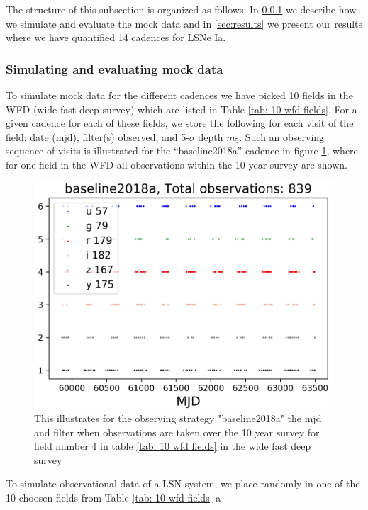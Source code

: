 The structure of this subsection is organized as follows. In
\ref{sec:simulation of mock data} we describe how we simulate and
evaluate the mock data and in \ref{sec:results} we present our results
where we have quantified 14 cadences for LSNe Ia.

\subsubsection{Simulating and evaluating mock data}
\label{sec:simulation of mock data}
To simulate mock data for the different cadences we have picked 10
fields in the WFD (wide fast deep survey) which are listed in Table
\ref{tab: 10 wfd fields}. For a given cadence for each of these
fields, we store the following for each visit of the field: date
(mjd), filter(s) observed, and 5-$\sigma$ depth $m_5$. Such an
observing sequence of visits is illustrated for the ``baseline2018a''
cadence in figure \ref{fig:observation patter LSST 10 year survey},
where for one field in the WFD all observations within the 10 year
survey are shown. 
%
\begin{figure}
\centering
\includegraphics[scale=0.7]{figures/field_number3_baseline2018a_Daniel.jpg}
\caption{This illustrates for the observing strategy "baseline2018a" the mjd and filter when observations are taken over the 10 year survey for field number 4 in table \ref{tab: 10 wfd fields} in the wide fast deep survey}
\label{fig:observation patter LSST 10 year survey}
\end{figure}
%
\FloatBarrier 
To simulate observational data of a LSN system, we place randomly in
one of the 10 choosen fields from Table \ref{tab: 10 wfd fields} a
